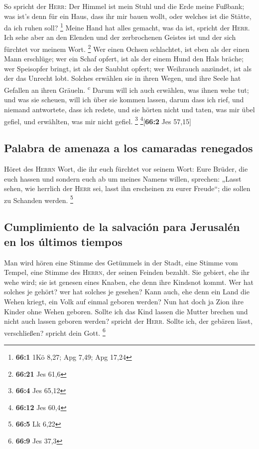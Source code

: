  So spricht der \textsc{Herr}: Der Himmel ist mein Stuhl
und die Erde meine Fußbank; was ist's denn für ein Haus, dass ihr mir
bauen wollt, oder welches ist die Stätte, da ich ruhen soll? \footnote{\textbf{66:1}
  1Kö 8,27; Apg 7,49; Apg 17,24}  Meine Hand hat alles
gemacht, was da ist, spricht der \textsc{Herr}. Ich sehe aber an den
Elenden und der zerbrochenen Geistes ist und der sich fürchtet vor
meinem Wort. \footnote{\textbf{66:21} Jes 61,6}  Wer einen
Ochsen schlachtet, ist eben als der einen Mann erschlüge; wer ein Schaf
opfert, ist als der einem Hund den Hals bräche; wer Speisopfer bringt,
ist als der Saublut opfert; wer Weihrauch anzündet, ist als der das
Unrecht lobt. Solches erwählen sie in ihren Wegen, und ihre Seele hat
Gefallen an ihren Gräueln. \textsuperscript{c}  Darum will
ich auch erwählen, was ihnen wehe tut; und was sie scheuen, will ich
über sie kommen lassen, darum dass ich rief, und niemand antwortete,
dass ich redete, und sie hörten nicht und taten, was mir übel gefiel,
und erwählten, was mir nicht gefiel. \footnote{\textbf{66:4} Jes 65,12}
\footnote{\textbf{66:12} Jes 60,4}{[}\textbf{66:2} Jes 57,15{]}

\hypertarget{palabra-de-amenaza-a-los-camaradas-renegados}{%
\subsection{Palabra de amenaza a los camaradas
renegados}\label{palabra-de-amenaza-a-los-camaradas-renegados}}

 Höret des \textsc{Herrn} Wort, die ihr euch fürchtet vor
seinem Wort: Eure Brüder, die euch hassen und sondern euch ab um meines
Namens willen, sprechen: „Lasst sehen, wie herrlich der \textsc{Herr}
sei, lasst ihn erscheinen zu eurer Freude``; die sollen zu Schanden
werden. \footnote{\textbf{66:5} Lk 6,22}

\hypertarget{cumplimiento-de-la-salvaciuxf3n-para-jerusaluxe9n-en-los-uxfaltimos-tiempos}{%
\subsection{Cumplimiento de la salvación para Jerusalén en los últimos
tiempos}\label{cumplimiento-de-la-salvaciuxf3n-para-jerusaluxe9n-en-los-uxfaltimos-tiempos}}

 Man wird hören eine Stimme des Getümmels in der Stadt,
eine Stimme vom Tempel, eine Stimme des \textsc{Herrn}, der seinen
Feinden bezahlt.  Sie gebiert, ehe ihr wehe wird; sie ist
genesen eines Knaben, ehe denn ihre Kindsnot kommt.  Wer
hat solches je gehört? wer hat solches je gesehen? Kann auch, ehe denn
ein Land die Wehen kriegt, ein Volk auf einmal geboren werden? Nun hat
doch ja Zion ihre Kinder ohne Wehen geboren.  Sollte ich
das Kind lassen die Mutter brechen und nicht auch lassen geboren werden?
spricht der \textsc{Herr}. Sollte ich, der gebären lässt, verschließen?
spricht dein Gott. \footnote{\textbf{66:9} Jes 37,3}

